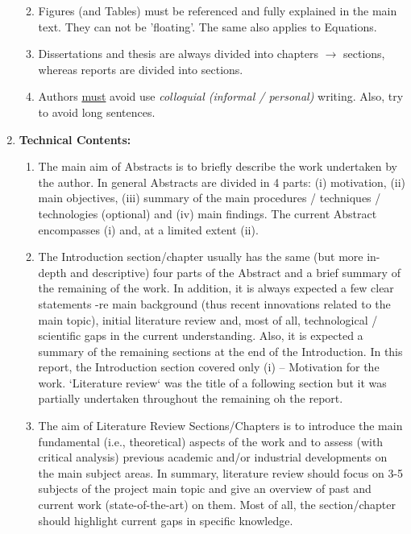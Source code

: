 \documentclass[14pt,twoside]{report}
\begin{document}
\begin{enumerate}
\begin{enumerate}
                       \item Figures (and Tables) must be referenced and fully explained in the main text. They can not be 'floating'. The same also applies to Equations.
                         \item Dissertations and thesis are always divided into chapters $\rightarrow$ sections, whereas reports are divided into sections.
                       \item Authors \underline{must} avoid use {\it colloquial (informal / personal)} writing. Also, try to avoid long sentences.
                \end{enumerate}
%
    \item {\bf Technical Contents:}
                \begin{enumerate}
                   \item The main aim of Abstracts is to briefly describe the work undertaken by the author. In general Abstracts are divided in 4 parts: (i) motivation, (ii) main objectives, (iii) summary of the main procedures / techniques / technologies (optional) and (iv) main findings. The current Abstract encompasses (i) and, at a limited extent (ii).
                   \item The Introduction section/chapter usually has the same (but more in-depth and descriptive) four parts of the Abstract and a brief summary of the remaining of the work. In addition, it is always expected a few clear statements -re main background (thus recent innovations related to the main topic), initial literature review and, most of all, technological / scientific gaps in the current understanding. Also, it is expected a summary of the remaining sections at the end of the Introduction. In this report, the Introduction section covered only (i) -- Motivation for the work. `Literature review` was the title of a following section but it was partially undertaken throughout the remaining oh the report. 
                   \item The aim of Literature Review Sections/Chapters is to introduce the main fundamental (i.e., theoretical) aspects of the work and to assess (with critical analysis) previous academic and/or industrial developments on the main subject areas. In summary, literature review should focus on 3-5 subjects of the project main topic and give an overview of past and current work (state-of-the-art) on them. Most of all, the section/chapter should highlight current gaps in specific knowledge.
                     

\end{enumerate}
\end{enumerate}
\end{document}

